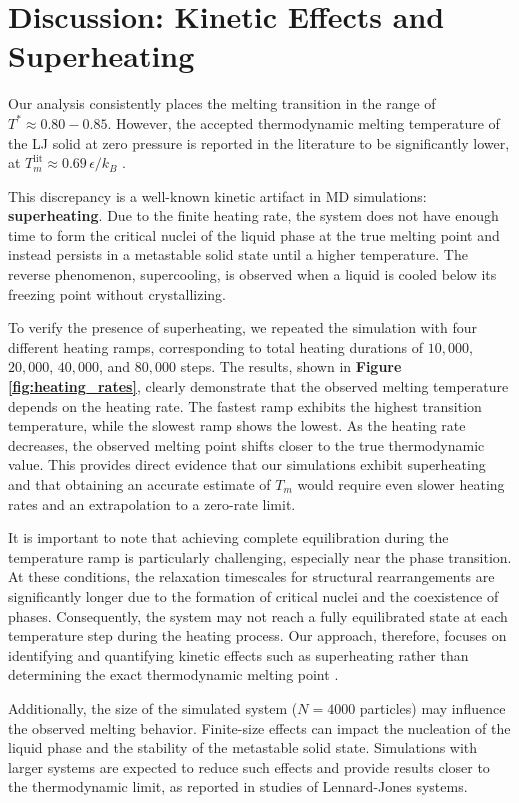 \documentclass{article}
\begin{document}
\section{Discussion: Kinetic Effects and Superheating}

Our analysis consistently places the melting transition in the range of $T^* \approx 0.80 - 0.85$. However, the accepted thermodynamic melting temperature of the LJ solid at zero pressure is reported in the literature to be significantly lower, at $T_m^{\text{lit}} \approx 0.69\,\epsilon/k_B$ \cite{HansenVerlet}.

This discrepancy is a well-known kinetic artifact in MD simulations: \textbf{superheating}. Due to the finite heating rate, the system does not have enough time to form the critical nuclei of the liquid phase at the true melting point and instead persists in a metastable solid state until a higher temperature. The reverse phenomenon, supercooling, is observed when a liquid is cooled below its freezing point without crystallizing.

To verify the presence of superheating, we repeated the simulation with four different heating ramps, corresponding to total heating durations of $10,000$, $20,000$, $40,000$, and $80,000$ steps. The results, shown in \textbf{Figure \ref{fig:heating_rates}}, clearly demonstrate that the observed melting temperature depends on the heating rate. The fastest ramp exhibits the highest transition temperature, while the slowest ramp shows the lowest. As the heating rate decreases, the observed melting point shifts closer to the true thermodynamic value. This provides direct evidence that our simulations exhibit superheating and that obtaining an accurate estimate of $T_m$ would require even slower heating rates and an extrapolation to a zero-rate limit.

It is important to note that achieving complete equilibration during the temperature ramp is particularly challenging, especially near the phase transition. At these conditions, the relaxation timescales for structural rearrangements are significantly longer due to the formation of critical nuclei and the coexistence of phases. Consequently, the system may not reach a fully equilibrated state at each temperature step during the heating process. Our approach, therefore, focuses on identifying and quantifying kinetic effects such as superheating rather than determining the exact thermodynamic melting point \cite{FrenkelSmit}.

Additionally, the size of the simulated system ($N=4000$ particles) may influence the observed melting behavior. Finite-size effects can impact the nucleation of the liquid phase and the stability of the metastable solid state. Simulations with larger systems are expected to reduce such effects and provide results closer to the thermodynamic limit, as reported in studies of Lennard-Jones systems.
\end{document}
